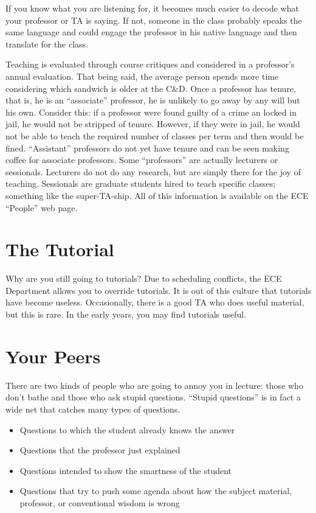 \documentclass{book}
\begin{document}
If you know what you are listening for, it becomes much easier to decode what your professor or TA is saying. If not, someone in the class probably speaks the same language and could engage the professor in his native language and then translate for the class.

Teaching is evaluated through course critiques and considered in a professor's annual evaluation. That being said, the average person spends more time considering which sandwich is older at the C\&D. Once a professor has tenure, that is, he is an ``associate'' professor, he is unlikely to go away by any will but his own. Consider this: if a professor were found guilty of a crime an locked in jail, he would not be stripped of tenure. However, if they were in jail, he would not be able to teach the required number of classes per term and then would be fined. ``Assistant'' professors do not yet have tenure and can be seen making coffee for associate professors. Some ``professors'' are actually lecturers or sessionals. Lecturers do not do any research, but are simply there for the joy of teaching. Sessionals are graduate students hired to teach specific classes; something like the super-TA-ship. All of this information is available on the ECE ``People'' web page.

\section{The Tutorial}
Why are you still going to tutorials? Due to scheduling conflicts, the ECE Department allows you to override tutorials. It is out of this culture that tutorials have become useless. Occasionally, there is a good TA who does useful material, but this is rare. In the early years, you may find tutorials useful.

\section{Your Peers}
There are two kinds of people who are going to annoy you in lecture: those who don't bathe and those who ask stupid questions. ``Stupid questions'' is in fact a wide net that catches many types of questions.

\begin{itemize}
\item Questions to which the student already knows the answer
\item Questions that the professor just explained
\item Questions intended to show the smartness of the student
\item Questions that try to push some agenda about how the subject material, professor, or conventional wisdom is wrong
\end{itemize}
\end{document}
